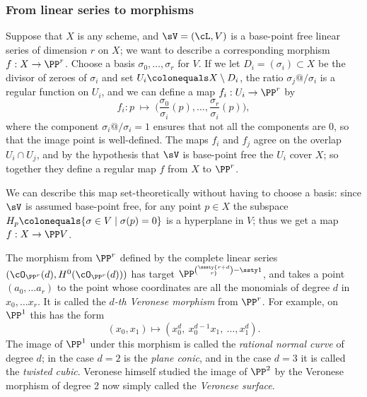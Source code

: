 \subsubsection*{From linear series to morphisms}

Suppose  that $X$ is any scheme, and $\sV = (\cL, V)$ is a base-point
free linear series of dimension $r$ on $X$; we want to describe a
corresponding morphism $f : X \to \PP^r$. Choose a basis $\sigma_0,
\dots, \sigma_r$ for $V$. If we let $D_i = (\sigma_i) \subset X$ be
the divisor of zeroes of $\sigma_i$ and
set
$U_i \colonequals X \setminus D_i$,
the ratio $\sigma_j@/\sigma_i$ is a regular function on $U_i$, and
we can define a map $f_i : U_i \to \PP^r$ by
$$
f_i : p \; \mapsto \; \Big(\frac{\sigma_0}{\sigma_i}(p), \dots, \frac{\sigma_r}{\sigma_i}(p)\Big),
$$
where the component $\sigma_i@/\sigma_i = 1$ ensures that not all the components are 0, so that the image point is well-defined.
The maps $f_i$ and $f_j$ agree on the overlap $U_i \cap U_j$, and by the hypothesis that $\sV$ is base-point free the $U_i$ cover $X$;
so together they define a regular map $f$ from $X$ to $\PP^r$.

We can describe this map set-theoretically without having to choose a
basis: since $\sV$ is assumed base-point free, for any point $p \in X$
the subspace $H_p \colonequals \{ \sigma \in V \mid \sigma(p) = 0 \}$
is a hyperplane in $V$; thus we get a map $f : X \to \PP V$.

\begin{example}\label{Veronese definition}
The morphism
\vspace*{-2pt}%
from $\PP^r$ defined by the complete linear series
$(\cO_{\PP^r}(d), H^0(\cO_{\PP^r}(d)))$ has target
$\PP^{\sssty{r+d\choose r}-\ssty 1}$,
and takes a point $(a_0,\dots a_r)$ to the point whose coordinates are all the monomials of
degree $d$ in $x_0,\dots x_r$. It is called the \emph{$d$-th Veronese morphism} from $\PP^r$. For example, on $\PP^1$ this has the form
%
%
$$
(x_0,x_1) \mapsto (x_0^d,\ x_0^{d-1}x_1,\ \dots,x_1^d).
$$
The image of $\PP^1$ under this morphism is called
%
%
%
%
the
\emph{rational normal curve}
of degree $d$; in the case $d=2$ is the
\emph{plane conic}, and in the case $d=3$ it is called the
\emph{twisted cubic}.
Veronese himself studied the image of $\PP^2$
by the Veronese morphism of degree 2 now simply called the
\emph{Veronese surface}.
\end{example}

